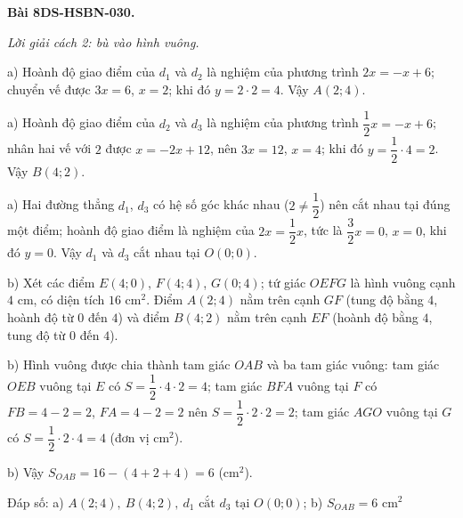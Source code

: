 \documentclass[12pt,a4paper]{article}
\newenvironment{problem}[1][]{\par\medskip\noindent\textbf{Bài #1.}\ }{\par}
\newenvironment{solution}[1][]{\par\noindent\textit{Lời giải #1.}\par}{\par}
\begin{document}
\begin{problem}[8DS-HSBN-030]
\begin{solution}[cách 2: bù vào hình vuông]
a) Hoành độ giao điểm của $d_1$ và $d_2$ là nghiệm của phương trình $2x = -x + 6$; chuyển vế được $3x = 6$, $x = 2$; khi đó $y = 2 \cdot 2 = 4$. Vậy $A(2; 4)$.

a) Hoành độ giao điểm của $d_2$ và $d_3$ là nghiệm của phương trình $\dfrac{1}{2}x = -x + 6$; nhân hai vế với $2$ được $x = -2x + 12$, nên $3x = 12$, $x = 4$; khi đó $y = \dfrac{1}{2} \cdot 4 = 2$. Vậy $B(4; 2)$.

a) Hai đường thẳng $d_1$, $d_3$ có hệ số góc khác nhau ($2 \neq \dfrac{1}{2}$) nên cắt nhau tại đúng một điểm; hoành độ giao điểm là nghiệm của $2x = \dfrac{1}{2}x$, tức là $\dfrac{3}{2}x = 0$, $x = 0$, khi đó $y = 0$. Vậy $d_1$ và $d_3$ cắt nhau tại $O(0; 0)$.

b) Xét các điểm $E(4; 0)$, $F(4; 4)$, $G(0; 4)$; tứ giác $OEFG$ là hình vuông cạnh $4$ cm, có diện tích $16$ cm$^2$. Điểm $A(2; 4)$ nằm trên cạnh $GF$ (tung độ bằng $4$, hoành độ từ $0$ đến $4$) và điểm $B(4; 2)$ nằm trên cạnh $EF$ (hoành độ bằng $4$, tung độ từ $0$ đến $4$).

b) Hình vuông được chia thành tam giác $OAB$ và ba tam giác vuông: tam giác $OEB$ vuông tại $E$ có $S = \dfrac{1}{2} \cdot 4 \cdot 2 = 4$; tam giác $BFA$ vuông tại $F$ có $FB = 4 - 2 = 2$, $FA = 4 - 2 = 2$ nên $S = \dfrac{1}{2} \cdot 2 \cdot 2 = 2$; tam giác $AGO$ vuông tại $G$ có $S = \dfrac{1}{2} \cdot 2 \cdot 4 = 4$ (đơn vị cm$^2$).

b) Vậy $S_{OAB} = 16 - (4 + 2 + 4) = 6$ (cm$^2$).

Đáp số: a) $\boxed{A(2; 4),\ B(4; 2),\ d_1 \text{ cắt } d_3 \text{ tại } O(0; 0)}$; b) $\boxed{S_{OAB} = 6 \text{ cm}^2}$
\end{solution}
\end{problem}
\end{document}
